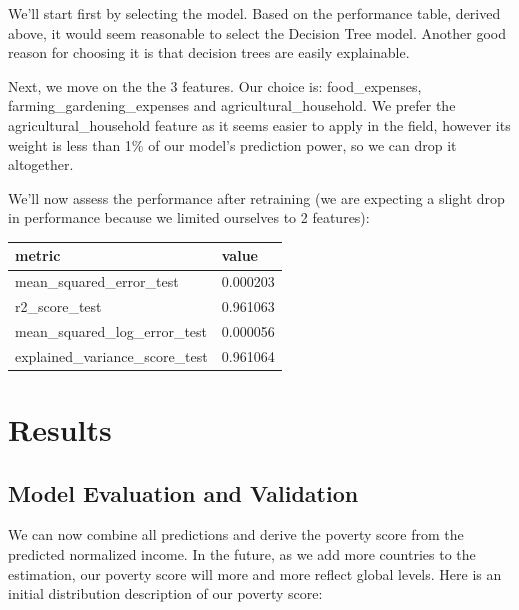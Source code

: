 \documentclass{article}
\begin{document}
We'll start first by selecting the model. Based on the performance table, derived above, it would seem reasonable to select the Decision Tree model. Another good reason for choosing it is that decision trees are easily explainable.

Next, we move on the the 3 features. Our choice is: food\_expenses, farming\_gardening\_expenses and agricultural\_household. We prefer the agricultural\_household feature as it seems easier to apply in the field, however its weight is less than 1\% of our model's prediction power, so we can drop it altogether.

We'll now assess the performance after retraining (we are expecting a slight drop in performance because we limited ourselves to 2 features):

\begin{center}
\begin{tabular}{ |l|l| }
  \hline
  metric & value\\
  \hline
  mean\_squared\_error\_test & 0.000203\\
  r2\_score\_test & 0.961063\\
  mean\_squared\_log\_error\_test & 0.000056\\
  explained\_variance\_score\_test & 0.961064\\
  \hline
\end{tabular}
\end{center}

\section{Results}
\subsection{Model Evaluation and Validation}
We can now combine all predictions and derive the poverty score from the predicted normalized income. In the future, as we add more countries to the estimation, our poverty score will more and more reflect global levels. Here is an initial distribution description of our poverty score:
\end{document}
